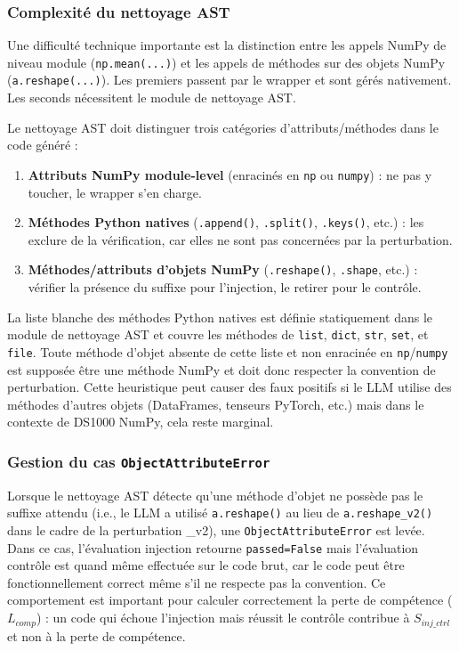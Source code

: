 \documentclass[11pt, a4paper]{article}
\begin{document}
\subsubsection{Complexité du nettoyage AST}

Une difficulté technique importante est la distinction entre les appels NumPy de niveau module (\texttt{np.mean(...)}) et les appels de méthodes sur des objets NumPy (\texttt{a.reshape(...)}). Les premiers passent par le wrapper et sont gérés nativement. Les seconds nécessitent le module de nettoyage AST.

Le nettoyage AST doit distinguer trois catégories d'attributs/méthodes dans le code généré :
\begin{enumerate}
    \item \textbf{Attributs NumPy module-level} (enracinés en \texttt{np} ou \texttt{numpy}) : ne pas y toucher, le wrapper s'en charge.
    \item \textbf{Méthodes Python natives} (\texttt{.append()}, \texttt{.split()}, \texttt{.keys()}, etc.) : les exclure de la vérification, car elles ne sont pas concernées par la perturbation.
    \item \textbf{Méthodes/attributs d'objets NumPy} (\texttt{.reshape()}, \texttt{.shape}, etc.) : vérifier la présence du suffixe pour l'injection, le retirer pour le contrôle.
\end{enumerate}

La liste blanche des méthodes Python natives est définie statiquement dans le module de nettoyage AST et couvre les méthodes de \texttt{list}, \texttt{dict}, \texttt{str}, \texttt{set}, et \texttt{file}. Toute méthode d'objet absente de cette liste et non enracinée en \texttt{np}/\texttt{numpy} est supposée être une méthode NumPy et doit donc respecter la convention de perturbation. Cette heuristique peut causer des faux positifs si le LLM utilise des méthodes d'autres objets (DataFrames, tenseurs PyTorch, etc.) mais dans le contexte de DS1000 NumPy, cela reste marginal.

\subsubsection{Gestion du cas \texttt{ObjectAttributeError}}

Lorsque le nettoyage AST détecte qu'une méthode d'objet ne possède pas le suffixe attendu (i.e., le LLM a utilisé \texttt{a.reshape()} au lieu de \texttt{a.reshape\_v2()} dans le cadre de la perturbation \_v2), une \texttt{ObjectAttributeError} est levée. Dans ce cas, l'évaluation injection retourne \texttt{passed=False} mais l'évaluation contrôle est quand même effectuée sur le code brut, car le code peut être fonctionnellement correct même s'il ne respecte pas la convention. Ce comportement est important pour calculer correctement la perte de compétence ($L_{comp}$) : un code qui échoue l'injection mais réussit le contrôle contribue à $S_{inj\_ctrl}$ et non à la perte de compétence.
\end{document}
